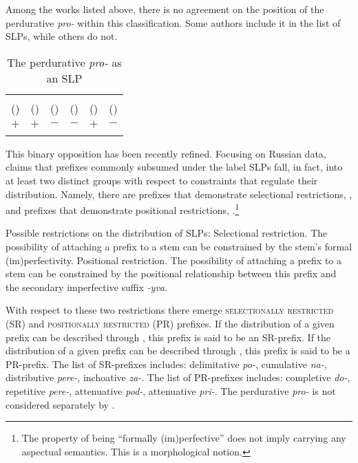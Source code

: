 \documentclass[output=paper,
]{langscibook}
\begin{document}
\noindent Among the works listed above, there is no agreement on the position of the perdurative \textit{pro-} within this classification. Some authors include it in the list of SLPs, while others do not.


\begin{table}[h!]
\caption{The perdurative \textit{pro-} as an SLP}
\small
\label{tab1}
\begin{tabularx}{\textwidth}{cCCCCC}
  \lsptoprule
            \citeauthor{babko1999zero}  &	\citeauthor{ramchand2005time} &	\citeauthor{svenonius2004slavic}  &	\citeauthor{romanova2007constructing}  &	\citeauthor{gehrke2008ps}  &	\citeauthor{tolskaya2015verbal}\\ 
            (\citeyear{babko1999zero}) & (\citeyear{ramchand2005time}) & (\citeyear{svenonius2004slavic}) & (\citeyear{romanova2007constructing}) & (\citeyear{gehrke2008ps}) & (\citeyear{tolskaya2015verbal}) \\
  \midrule
 $+$ &    $+$  &    $-$ & $-$ & $+$ & $-$\\
  \lspbottomrule
 \end{tabularx}
\end{table}  

This binary opposition has been recently refined. Focusing on Russian data, \citet{tatevosov2009mnozestvennaja,tatevosov2013mnozestvennaja} claims that prefixes commonly subsumed under the label SLPs fall, in fact, into at least two distinct groups with respect to constraints that regulate their distribution. Namely, there are prefixes that demonstrate selectional restrictions, , and prefixes that demonstrate positional restrictions, .\footnote{ The property of being ``formally (im)perfective'' does not imply carrying any aspectual semantics. This is a morphological notion.}


\ea \label{ex:naumov:6} Possible restrictions on the distribution of SLPs:
\ea \label{ex:naumov:6a} Selectional restriction. The possibility of attaching a prefix to a stem can be constrained by the stem's formal (im)perfectivity.
\ex \label{ex:naumov:6b} Positional restriction. The possibility of attaching a prefix to a stem can be constrained by the positional relationship between this prefix and the secondary imperfective suffix \textit{-yva}.
\z \z

\noindent With respect to these two restrictions there emerge \textsc{selectionally restricted} (SR) and \textsc{positionally restricted} (PR) prefixes. If the distribution of a given prefix can be described through , this prefix is said to be an SR-prefix. If the distribution of a given prefix can be described through , this prefix is said to be a PR-prefix. The list of SR-prefixes includes: delimitative \textit{po-}, cumulative \mbox{\textit{na-},} distributive \textit{pere-}, inchoative \textit{za-}. The list of PR-prefixes includes: completive \mbox{\textit{do-},} repetitive \textit{pere-}, attenuative \textit{pod-}, attenuative \textit{pri-}. The perdurative \textit{pro-} is not considered separately by \citet{tatevosov2009mnozestvennaja, tatevosov2013mnozestvennaja}.
\end{document}
